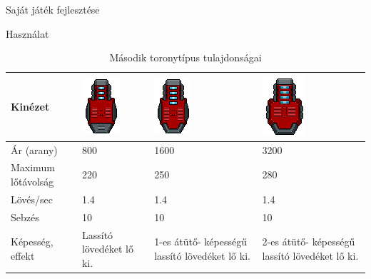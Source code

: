 \begin{MyChapter}{Saját játék fejlesztése}
\begin{MySection}{Használat}
		\begin{table}[H]
			\centering
			\caption{Második toronytípus tulajdonságai}
			\label{tab:torony_tipus_1}
			\begin{tabular}{|l|C{2.85cm}|C{3.06cm}|C{3.06cm}|}
				\hline
				Kinézet & \includegraphics[scale=0.78]{kepek/jatekHasznalat/torony_11} & \includegraphics[scale=0.78]{kepek/jatekHasznalat/torony_12} & \includegraphics[scale=0.78]{kepek/jatekHasznalat/torony_13} \\ \hline
				Ár (arany) & 800 & 1600 & 3200 \\ \hline
				Maximum lőtávolság & 220 & 250 & 280 \\ \hline
				Lövés/sec & 1.4 & 1.4 & 1.4 \\ \hline
				Sebzés & 10 & 10 & 10 \\ \hline
				Képesség, effekt & Lassító lövedéket lő ki. & 1-es átütő- képességű lassító lövedéket lő ki. & 2-es átütő- képességű lassító lövedéket lő ki. \\ \hline
			\end{tabular}
		\end{table}
	

\end{MySection}
\end{MyChapter}
